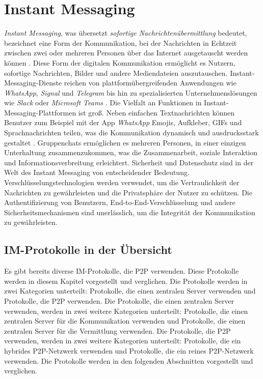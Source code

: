 \section{Instant Messaging}


\textit{Instant Messaging}, was übersetzt \textit{sofortige Nachrichtenübermittlung} bedeutet, bezeichnet eine Form der Kommunikation, bei der Nachrichten in Echtzeit zwischen zwei oder mehreren Personen über das Internet ausgetauscht werden können \Parencite[S. 69]{nist_mobileDeviceForensics}. Diese Form der digitalen Kommunikation ermöglicht es Nutzern, sofortige Nachrichten, Bilder und andere Mediendateien auszutauschen. Instant-Messaging-Dienste reichen von plattformübergreifenden Anwendungen wie \textit{WhatsApp}, \textit{Signal} und \textit{Telegram} bis hin zu spezialisierten Unternehmenslösungen wie \textit{Slack} oder \textit{Microsoft Teams} \parencite{Plett_IMDefinition}. Die Vielfalt an Funktionen in Instant-Messaging-Plattformen ist groß. Neben einfachen Textnachrichten können Benutzer zum Beispiel mit der App \textit{WhatsApp} Emojis, Aufkleber, GIFs und Sprachnachrichten teilen, was die Kommunikation dynamisch und ausdrucksstark gestaltet \Parencite{whatsapp_funktionen}. Gruppenchats ermöglichen es mehreren Personen, in einer einzigen Unterhaltung zusammenzukommen, was die Zusammenarbeit, soziale Interaktion und Informationsverbreitung erleichtert.
Sicherheit und Datenschutz sind in der Welt des Instant Messaging von entscheidender Bedeutung. Verschlüsselungstechnologien werden verwendet, um die Vertraulichkeit der Nachrichten zu gewährleisten und die Privatsphäre der Nutzer zu schützen. Die Authentifizierung von Benutzern, End-to-End-Verschlüsselung und andere Sicherheitsmechanismen sind unerlässlich, um die Integrität der Kommunikation zu gewährleisten.


\subsection{IM-Protokolle in der Übersicht}

Es gibt bereits diverse IM-Protokolle, die P2P verwenden. Diese Protokolle werden in diesem Kapitel
vorgestellt und verglichen. Die Protokolle werden in zwei Kategorien unterteilt: Protokolle, die
einen zentralen Server verwenden und Protokolle, die P2P verwenden. Die Protokolle, die einen
zentralen Server verwenden, werden in zwei weitere Kategorien unterteilt: Protokolle, die
einen zentralen Server für die Kommunikation verwenden und Protokolle, die einen zentralen
Server für die Vermittlung verwenden. Die Protokolle, die P2P verwenden, werden in zwei weitere
Kategorien unterteilt: Protokolle, die ein hybrides P2P-Netzwerk verwenden und Protokolle, die
ein reines P2P-Netzwerk verwenden. Die Protokolle werden in den folgenden Abschnitten vorgestellt
und verglichen.

